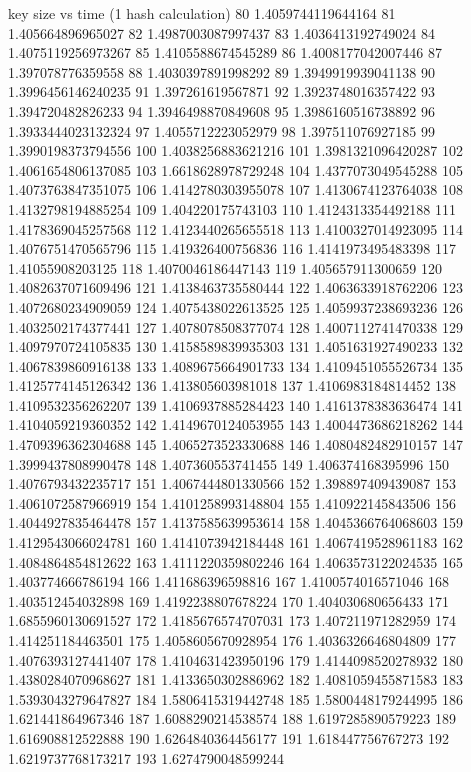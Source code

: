 key size vs time (1 hash calculation)
80 1.4059744119644164
81 1.405664896965027
82 1.4987003087997437
83 1.4036413192749024
84 1.4075119256973267
85 1.4105588674545289
86 1.4008177042007446
87 1.397078776359558
88 1.4030397891998292
89 1.3949919939041138
90 1.3996456146240235
91 1.397261619567871
92 1.3923748016357422
93 1.394720482826233
94 1.3946498870849608
95 1.3986160516738892
96 1.3933444023132324
97 1.4055712223052979
98 1.397511076927185
99 1.3990198373794556
100 1.4038256883621216
101 1.3981321096420287
102 1.4061654806137085
103 1.6618628978729248
104 1.4377073049545288
105 1.4073763847351075
106 1.4142780303955078
107 1.4130674123764038
108 1.4132798194885254
109 1.404220175743103
110 1.4124313354492188
111 1.4178369045257568
112 1.4123440265655518
113 1.4100327014923095
114 1.4076751470565796
115 1.419326400756836
116 1.4141973495483398
117 1.41055908203125
118 1.4070046186447143
119 1.405657911300659
120 1.4082637071609496
121 1.4138463735580444
122 1.4063633918762206
123 1.4072680234909059
124 1.4075438022613525
125 1.4059937238693236
126 1.4032502174377441
127 1.4078078508377074
128 1.4007112741470338
129 1.4097970724105835
130 1.4158589839935303
131 1.4051631927490233
132 1.4067839860916138
133 1.4089675664901733
134 1.4109451055526734
135 1.4125774145126342
136 1.413805603981018
137 1.4106983184814452
138 1.4109532356262207
139 1.4106937885284423
140 1.4161378383636474
141 1.4104059219360352
142 1.4149670124053955
143 1.4004473686218262
144 1.4709396362304688
145 1.4065273523330688
146 1.4080482482910157
147 1.3999437808990478
148 1.407360553741455
149 1.406374168395996
150 1.4076793432235717
151 1.4067444801330566
152 1.398897409439087
153 1.4061072587966919
154 1.4101258993148804
155 1.410922145843506
156 1.4044927835464478
157 1.4137585639953614
158 1.4045366764068603
159 1.4129543066024781
160 1.4141073942184448
161 1.4067419528961183
162 1.4084864854812622
163 1.4111220359802246
164 1.4063573122024535
165 1.403774666786194
166 1.411686396598816
167 1.4100574016571046
168 1.403512454032898
169 1.4192238807678224
170 1.404030680656433
171 1.6855960130691527
172 1.4185676574707031
173 1.407211971282959
174 1.414251184463501
175 1.4058605670928954
176 1.4036326646804809
177 1.4076393127441407
178 1.4104631423950196
179 1.4144098520278932
180 1.4380284070968627
181 1.4133650302886962
182 1.4081059455871583
183 1.5393043279647827
184 1.5806415319442748
185 1.5800448179244995
186 1.621441864967346
187 1.6088290214538574
188 1.6197285890579223
189 1.616908812522888
190 1.6264840364456177
191 1.618447756767273
192 1.6219737768173217
193 1.6274790048599244
